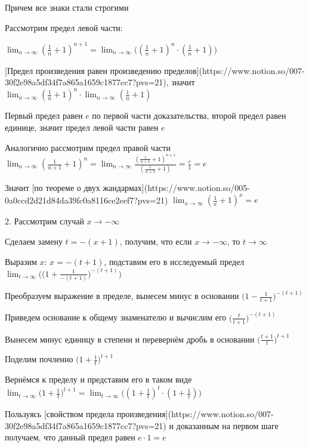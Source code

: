 Причем все знаки стали строгими

Рассмотрим предел левой части:

$\displaystyle{\lim_{n \to \infty}{(\frac1n + 1)^{n + 1}} = \lim_{n \to \infty}{\Big((\frac1n + 1)^n \cdot (\frac1n + 1)\Big)}}$

[Предел произведения равен произведению пределов](https://www.notion.so/007-30f2e98a5df34f7a865a1659c1877cc7?pvs=21), значит
$\displaystyle{\lim_{n \to \infty}{(\frac1n + 1)^n} \cdot \lim_{n \to \infty}{(\frac1n + 1)}}$

Первый предел равен $e$ по первой части доказательства, второй предел равен единице, значит предел левой части равен $e$

Аналогично рассмотрим предел правой части $\displaystyle{\lim_{n \to \infty}{(\frac{1}{n + 1} + 1)^n} = \lim_{n \to \infty}{\frac{(\frac{1}{n + 1} + 1)^{n + 1}}{(\frac{1}{n + 1} + 1)}} = \frac{e}{1} = e}$

Значит [по теореме о двух жандармах](https://www.notion.so/005-0a0ccd2d21d84da39fc0a8116ce2eef7?pvs=21) $\displaystyle{\lim_{x \to \infty}{(\frac{1}{x} + 1)^x} = e}$

2. Рассмотрим случай $x \to -\infty$

Сделаем замену $t = -(x + 1)$, получим, что
если $x \to -\infty$, то $t \to \infty$

Выразим $x$: $x = -(t + 1)$, подставим его в исследуемый предел $\displaystyle{\lim_{t \to \infty}{\bigg(\Big(1 + \frac{1}{-(t + 1)}\Big)^{-(t + 1)}\bigg)}}$

Преобразуем выражение в пределе, вынесем минус в основании $\displaystyle{\Big(1 - \frac{1}{t + 1}\Big)^{-(t + 1)}}$

Приведем основание к общему знаменателю и вычислим его $\displaystyle{\Big(\frac{t}{t + 1}\Big)^{-(t + 1)}}$

Вынесем минус единицу в степени и перевернём дробь в основании $\displaystyle{\Big(\frac{t + 1}{t}\Big)^{t + 1}}$

Поделим почленно $\displaystyle{\Big(1 + \frac{1}{t}\Big)^{t + 1}}$

Вернёмся к пределу и представим его в таком виде $\displaystyle{\lim_{t \to \infty}{\Big(1 + \frac{1}{t}\Big)^{t + 1}} = \lim_{t \to \infty}{\Big( (1 + \frac{1}{t})^t \cdot (1 + \frac{1}{t}) \Big)}}$

Пользуясь [свойством предела произведения](https://www.notion.so/007-30f2e98a5df34f7a865a1659c1877cc7?pvs=21) и доказанным на первом шаге получаем, что данный предел равен $e \cdot 1 = e$

